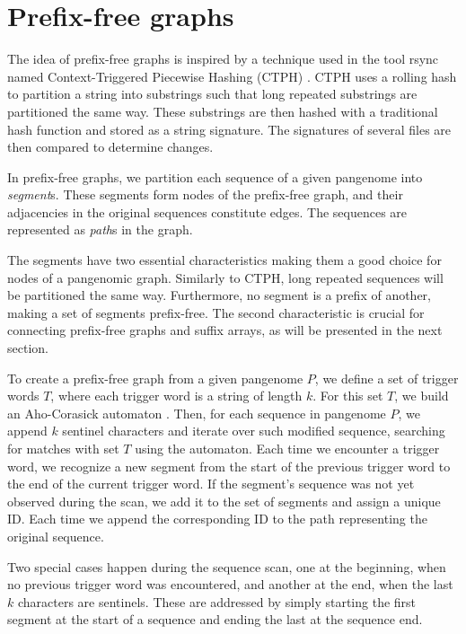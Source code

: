 \section{Prefix-free graphs}
The idea of prefix-free graphs is inspired by a technique used in the tool rsync named Context-Triggered Piecewise Hashing (CTPH) \cite{kornblum2006identifying}.
CTPH uses a rolling hash to partition a string into substrings such that long repeated substrings are partitioned the same way.
These substrings are then hashed with a traditional hash function and stored as a string signature.
The signatures of several files are then compared to determine changes.

In prefix-free graphs, we partition each sequence of a given pangenome into \emph{segment}s.
These segments form nodes of the prefix-free graph, and their adjacencies in the original sequences constitute edges.
The sequences are represented as \emph{path}s in the graph.

The segments have two essential characteristics making them a good choice for nodes of a pangenomic graph.
Similarly to CTPH, long repeated sequences will be partitioned the same way.
Furthermore, no segment is a prefix of another, making a set of segments prefix-free.
The second characteristic is crucial for connecting prefix-free graphs and suffix arrays, as will be presented in the next section.

To create a prefix-free graph from a given pangenome $P$, we define a set of trigger words $T$, where each trigger word is a string of length $k$.
For this set $T$, we build an Aho-Corasick automaton \cite{aho1975efficient}.
Then, for each sequence in pangenome $P$, we append $k$ sentinel characters and iterate over such modified sequence, searching for matches with set $T$ using the automaton.
Each time we encounter a trigger word, we recognize a new segment from the start of the previous trigger word to the end of the current trigger word.
If the segment's sequence was not yet observed during the scan, we add it to the set of segments and assign a unique ID.
Each time we append the corresponding ID to the path representing the original sequence. 

Two special cases happen during the sequence scan, one at the beginning, when no previous trigger word was encountered, and another at the end, when the last $k$ characters are sentinels.
These are addressed by simply starting the first segment at the start of a sequence and ending the last at the sequence end.

